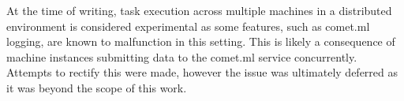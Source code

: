 \documentclass[../../fyp.tex]{subfiles}
\begin{document}
At the time of writing, task execution across multiple machines in a distributed environment is considered experimental as some features, such as comet.ml logging, are known to malfunction in this setting. This is likely a consequence of machine instances submitting data to the comet.ml service concurrently. Attempts to rectify this were made, however the issue was ultimately deferred as it was beyond the scope of this work.
\end{document}
